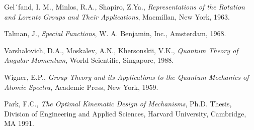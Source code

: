 \documentclass{svmult}
\begin{document}
\begin{thebibliography}{99}
Gel´fand, I. M., Minlos, R.A., Shapiro, Z.Ya., {\it
Representations of the Rotation and Lorentz Groups and Their Applications}, Macmillan, New York, 1963. 

Talman, J., {\it Special Functions}, W. A. Benjamin, Inc.,
Amsterdam, 1968.

Varshalovich, D.A., Moskalev, A.N., Khersonskii, V.K.,
{\it Quantum Theory of Angular Momentum}, World Scientific,
Singapore, 1988.

Wigner, E.P.,
{\it Group Theory and its Applications to the Quantum Mechanics
of Atomic Spectra}, Academic Press, New York, 1959.

Park, F.C., {\it The Optimal Kinematic Design of Mechanisms},
Ph.D. Thesis, Division of Engineering and Applied Sciences,
Harvard University, Cambridge, MA 1991.

\end{thebibliography}
\end{document}
